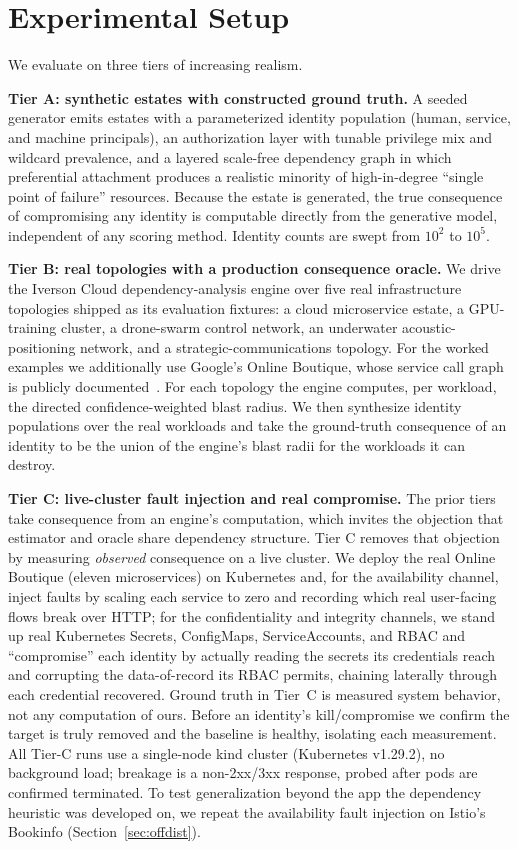 \documentclass[conference]{IEEEtran}
\begin{document}
\section{Experimental Setup}
\label{sec:setup}
We evaluate on three tiers of increasing realism.

\textbf{Tier A: synthetic estates with constructed ground truth.} A seeded generator
emits estates with a parameterized identity population (human, service, and machine
principals), an authorization layer with tunable privilege mix and wildcard
prevalence, and a layered scale-free dependency graph in which preferential
attachment produces a realistic minority of high-in-degree ``single point of
failure'' resources. Because the estate is generated, the true consequence of
compromising any identity is computable directly from the generative model,
independent of any scoring method. Identity counts are swept from $10^2$ to $10^5$.

\textbf{Tier B: real topologies with a production consequence oracle.} We drive the
Iverson Cloud dependency-analysis engine over five real infrastructure topologies
shipped as its evaluation fixtures: a cloud microservice estate, a GPU-training
cluster, a drone-swarm control network, an underwater acoustic-positioning network,
and a strategic-communications topology. For the worked examples we additionally use
Google's Online Boutique, whose service call graph is publicly documented~\cite{ob}.
For each topology the engine computes, per workload, the directed
confidence-weighted blast radius. We then synthesize identity populations over the
real workloads and take the ground-truth consequence of an identity to be the union
of the engine's blast radii for the workloads it can destroy.

\textbf{Tier C: live-cluster fault injection and real compromise.} The prior tiers
take consequence from an engine's computation, which invites the objection that
estimator and oracle share dependency structure. Tier C removes that objection by
measuring \emph{observed} consequence on a live cluster. We deploy the real Online
Boutique (eleven microservices) on Kubernetes and, for the availability channel,
inject faults by scaling each service to zero and recording which real user-facing
flows break over HTTP; for the confidentiality and integrity channels, we stand up
real Kubernetes Secrets, ConfigMaps, ServiceAccounts, and RBAC and ``compromise'' each
identity by actually reading the secrets its credentials reach and corrupting the
data-of-record its RBAC permits, chaining laterally through each credential recovered. Ground truth in Tier~C is measured system
behavior, not any computation of ours. Before an identity's kill/compromise we confirm
the target is truly removed and the baseline is healthy, isolating each measurement. All Tier-C
runs use a single-node kind cluster (Kubernetes v1.29.2), no background load;
breakage is a non-2xx/3xx response, probed after pods are confirmed terminated. To test generalization beyond the app the dependency heuristic was developed on, we repeat
the availability fault injection on Istio's Bookinfo (Section~\ref{sec:offdist}).
\end{document}
